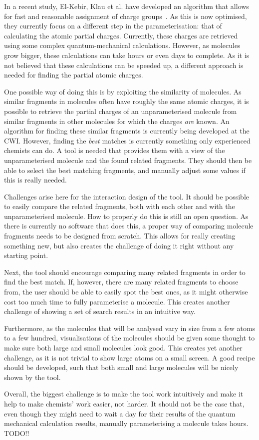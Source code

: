 In a recent study, El-Kebir, Klau et al. have developed an algorithm that allows for fast and reasonable assignment of charge groups~\cite{canzar2012charge}. As this is now optimised, they currently focus on a different step in the parameterisation: that of calculating the atomic partial charges. Currently, these charges are retrieved using some complex quantum-mechanical calculations. However, as molecules grow bigger, these calculations can take hours or even days to complete. As it is not believed that these calculations can be speeded up, a different approach is needed for finding the partial atomic charges.

One possible way of doing this is by exploiting the similarity of molecules. As similar fragments in molecules often have roughly the same atomic charges, it is possible to retrieve the partial charges of an unparameterised molecule from similar fragments in other molecules for which the charges \emph{are} known. An algorithm for finding these similar fragments is currently being developed at the CWI. However, finding the \emph{best} matches is currently something only experienced chemists can do. A tool is needed that provides them with a view of the unparameterised molecule and the found related fragments. They should then be able to select the best matching fragments, and manually adjust some values if this is really needed.

Challenges arise here for the interaction design of the tool. It should be possible to easily compare the related fragments, both with each other and with the unparameterised molecule. How to properly do this is still an open question. As there is currently no software that does this, a proper way of comparing molecule fragments needs to be designed from scratch. This allows for really creating something new, but also creates the challenge of doing it right without any starting point.

Next, the tool should encourage comparing many related fragments in order to find the best match. If, however, there are many related fragments to choose from, the user should be able to easily spot the best ones, as it might otherwise cost too much time to fully parameterise a molecule. This creates another challenge of showing a set of search results in an intuitive way.

Furthermore, as the molecules that will be analysed vary in size from a few atoms to a few hundred, visualisations of the molecules should be given some thought to make sure both large and small molecules look good. This creates yet another challenge, as it is not trivial to show large atoms on a small screen. A good recipe should be developed, such that both small and large molecules will be nicely shown by the tool.

Overall, the biggest challenge is to make the tool work intuitively and make it help to make chemists' work easier, not harder. It should not be the case that, even though they might need to wait a day for their results of the quantum mechanical calculation results, manually parameterising a molecule takes hours. TODO!!
